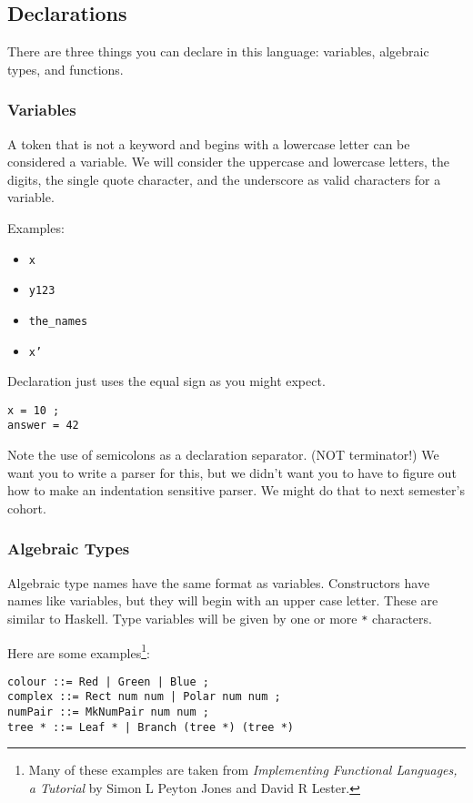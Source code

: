\documentclass[11pt]{article}
\begin{document}
\subsection{Declarations}
\label{sec:orgea94906}

There are three things you can declare in this language: variables, algebraic types, and functions.
\subsubsection{Variables}
\label{sec:org62dbad2}

A token that is not a keyword and begins with a lowercase letter can be considered a variable.  We will consider the
uppercase and lowercase letters, the digits, the single quote character, and the underscore as valid characters for a variable.

Examples:
\begin{itemize}
\item \texttt{x}
\item \texttt{y123}
\item \texttt{the\_names}
\item \texttt{x'}
\end{itemize}

Declaration just uses the equal sign as you might expect.

\begin{verbatim}
x = 10 ;
answer = 42
\end{verbatim}

Note the use of semicolons as a declaration separator.  (NOT terminator!)  We want you to write a parser for this, but
we didn't want you to have to figure out how to make an indentation sensitive parser.  We might do that to next semester's
cohort.
\subsubsection{Algebraic Types}
\label{sec:org6e6c56f}

Algebraic type names have the same format as variables.  Constructors have names like variables, but they will begin
with an upper case letter.  These are similar to Haskell.  Type variables will be given by one or more \texttt{*} characters.

Here are some examples\footnote{Many of these examples are taken from \emph{Implementing Functional Languages, a Tutorial} by Simon L Peyton Jones and David R Lester.}:

\begin{verbatim}
colour ::= Red | Green | Blue ;
complex ::= Rect num num | Polar num num ;
numPair ::= MkNumPair num num ;
tree * ::= Leaf * | Branch (tree *) (tree *)
\end{verbatim}
\end{document}
